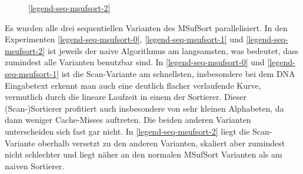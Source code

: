 \begin{figure}[ht]

    \medskip
    \ref{legend-seq-msufsort-2}
\end{figure}
\FloatBarrier

Es wurden alle drei sequentiellen Varianten des MSufSort parallelisiert.
In  den Experimenten \ref{legend-seq-msufsort-0}, \ref{legend-seq-msufsort-1} und \ref{legend-seq-msufsort-2} ist jeweils der naive Algorithmus am langsamsten, was bedeutet,
dass zumindest alle Varianten benutzbar sind. In \ref{legend-seq-msufsort-0} und \ref{legend-seq-msufsort-1} ist die Scan-Variante am schnellsten,
insbesondere bei dem DNA Eingabetext erkennt man auch eine deutlich flacher verlaufende Kurve,
vermutlich durch die lineare Laufzeit in einem der Sortierer.
Dieser (Scan-)Sortierer profitiert auch insbesondere von sehr kleinen Alphabeten,
da dann weniger Cache-Misses auftreten. Die beiden anderen Varianten unterscheiden sich fast gar nicht.
In \ref{legend-seq-msufsort-2} liegt die Scan-Variante oberhalb versetzt zu den anderen Varianten,
skaliert aber zumindest nicht schlechter und liegt näher an den normalen MSufSort Varianten als am naiven Sortierer.
